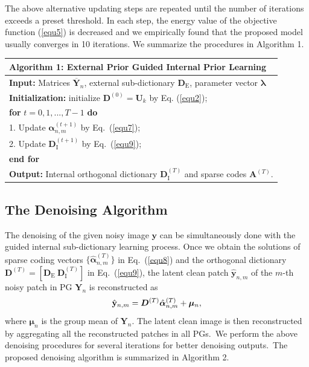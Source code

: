 The above alternative updating steps are repeated until the number of iterations exceeds a preset threshold. In each step, the energy value of the objective function (\ref{equ5}) is decreased and we empirically found that the proposed model usually converges in 10 iterations. We summarize the procedures in Algorithm 1.


\begin{table}\label{alg1}\vspace{3mm}
\begin{tabular}{l}
\hline
\textbf{Algorithm 1}: External Prior Guided Internal Prior Learning
\\
\hline
\textbf{Input:} Matrices $\bm{\overline{Y}}_{n}$, external sub-dictionary $\bm{D}_{\text{E}}$, parameter vector $\bm{\lambda}$
\\
\textbf{Initialization:} initialize $\bm{D}^{(0)}=\bm{U}_{k}$ by Eq. (\ref{equ2});
\\
\textbf{for} $t=0,1, ...,T-1$ \textbf{do}
\\
1. Update $\bm{\alpha}_{n,m}^{(t+1)}$ by Eq.\ (\ref{equ7});
\\
2. Update $\bm{D}_{\text{I}}^{(t+1)}$ by Eq.\ (\ref{equ9});
\\
\textbf{end for}
\\
\textbf{Output:} Internal orthogonal dictionary $\bm{D}_{\text{I}}^{(T)}$ and sparse codes $\textbf{A}^{(T)}$.
\\
\hline
\end{tabular}
\end{table}



\subsection{The Denoising Algorithm}

The denoising of the given noisy image $\mathbf{y}$ can be simultaneously done with the guided internal sub-dictionary learning process. Once we obtain the solutions of sparse coding vectors $\{\hat{\bm{\alpha}}_{n,m}^{(T)}\}$ in Eq.\ (\ref{equ8}) and the orthogonal dictionary $\bm{D}^{(T)} = [\bm{D}_{\text{E}}\ \bm{D}_{\text{I}}^{(T)}]$ in Eq.\ (\ref{equ9}), the latent clean patch $\hat{\mathbf{y}}_{n,m}$ of the $m$-th noisy patch in PG $\bm{Y}_{n}$ is reconstructed as
\vspace{-2mm}
\begin{equation}\label{equ13}
\vspace{-2mm}
\hat{\mathbf{y}}_{n,m}=\bm{D}^{(T)}\hat{\bm{\alpha}}_{n,m}^{(T)}+\bm{\mu}_{n},
\end{equation}
where $\bm{\mu}_{n}$ is the group mean of $\bm{Y}_{n}$. The latent clean image is then reconstructed by aggregating all the reconstructed patches in all PGs.\ We perform the above denoising procedures for several iterations for better denoising outputs.\ The proposed denoising algorithm is summarized in Algorithm 2.

